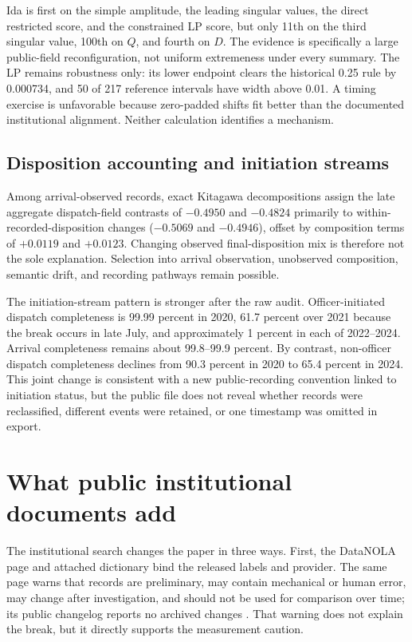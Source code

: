 \documentclass[11pt]{article}
\begin{document}
Ida is first on the simple amplitude, the leading singular values, the direct restricted score, and the constrained LP score, but only 11th on the third singular value, 100th on $Q$, and fourth on $D$. The evidence is specifically a large public-field reconfiguration, not uniform extremeness under every summary. The LP remains robustness only: its lower endpoint clears the historical 0.25 rule by 0.000734, and 50 of 217 reference intervals have width above 0.01. A timing exercise is unfavorable because zero-padded shifts fit better than the documented institutional alignment. Neither calculation identifies a mechanism.

\subsection{Disposition accounting and initiation streams}

Among arrival-observed records, exact Kitagawa decompositions assign the late aggregate dispatch-field contrasts of $-0.4950$ and $-0.4824$ primarily to within-recorded-disposition changes ($-0.5069$ and $-0.4946$), offset by composition terms of $+0.0119$ and $+0.0123$. Changing observed final-disposition mix is therefore not the sole explanation. Selection into arrival observation, unobserved composition, semantic drift, and recording pathways remain possible.

The initiation-stream pattern is stronger after the raw audit. Officer-initiated dispatch completeness is 99.99 percent in 2020, 61.7 percent over 2021 because the break occurs in late July, and approximately 1 percent in each of 2022--2024. Arrival completeness remains about 99.8--99.9 percent. By contrast, non-officer dispatch completeness declines from 90.3 percent in 2020 to 65.4 percent in 2024. This joint change is consistent with a new public-recording convention linked to initiation status, but the public file does not reveal whether records were reclassified, different events were retained, or one timestamp was omitted in export.

\section{What public institutional documents add}

The institutional search changes the paper in three ways. First, the DataNOLA page and attached dictionary bind the released labels and provider. The same page warns that records are preliminary, may contain mechanical or human error, may change after investigation, and should not be used for comparison over time; its public changelog reports no archived changes \citep{DataNOLA2021}. That warning does not explain the break, but it directly supports the measurement caution.
\end{document}

